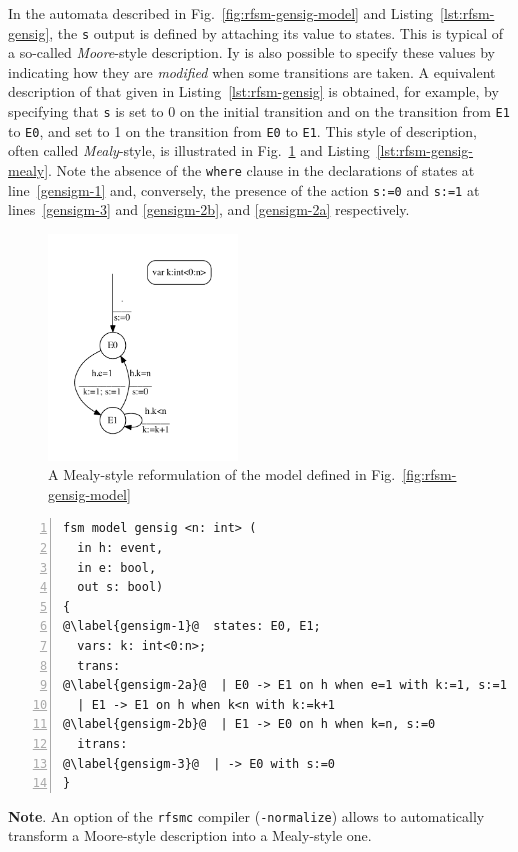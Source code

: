 In the automata described in Fig.~\ref{fig:rfsm-gensig-model} and Listing~\ref{lst:rfsm-gensig}, the
\texttt{s} output is defined by attaching its value to states.
This is typical of a so-called \emph{Moore}-style description.
Iy is also possible to specify these values by indicating how they are \emph{modified} when some
transitions are taken. A equivalent description of that given in Listing~\ref{lst:rfsm-gensig} is
obtained, for example, by specifying that
\texttt{s} is set to 0 on the initial transition and on the transition from \texttt{E1} to
\texttt{E0}, and set to 1 on the transition from \texttt{E0} to \texttt{E1}. 
This style of description, often called \emph{Mealy}-style, is illustrated in
Fig.~\ref{fig:rfsm-gensig-mealy} and
Listing~\ref{lst:rfsm-gensig-mealy}. Note the absence of the \texttt{where} clause in the
declarations of states at line~\ref{gensigm-1} and, conversely, the presence of the action
\lstinline[language=Rfsm]{s:=0} and \lstinline[language=Rfsm]{s:=1} at lines~\ref{gensigm-3} and
\ref{gensigm-2b}, and \ref{gensigm-2a} respectively.

\begin{figure}[!h]
   \includegraphics[height=6cm]{figs/gensig-model-mealy}
   \centering
  \caption{A Mealy-style reformulation of the model defined in Fig.~\ref{fig:rfsm-gensig-model}}
  \label{fig:rfsm-gensig-mealy}
\end{figure}

\begin{lstlisting}[language=Rfsm,frame=single,numbers=left,caption=Transcription in RFSM of the
  model given in Fig.~\ref{fig:rfsm-gensig-mealy},label={lst:rfsm-gensig-mealy},float]
fsm model gensig <n: int> (
  in h: event,
  in e: bool,
  out s: bool)
{
@\label{gensigm-1}@  states: E0, E1;
  vars: k: int<0:n>;
  trans:
@\label{gensigm-2a}@  | E0 -> E1 on h when e=1 with k:=1, s:=1
  | E1 -> E1 on h when k<n with k:=k+1
@\label{gensigm-2b}@  | E1 -> E0 on h when k=n, s:=0
  itrans:
@\label{gensigm-3}@  | -> E0 with s:=0
}
\end{lstlisting}

\medskip \textbf{Note}. An option of the \texttt{rfsmc} compiler (\verb|-normalize|) allows to
automatically transform a Moore-style description into a Mealy-style one.



